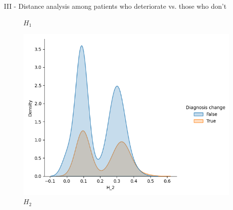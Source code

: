 \documentclass[aspectratio=169, 10pt, dvipsnames]{beamer}
\begin{document}
\begin{frame}[fragile]{III - Distance analysis among patients who deteriorate vs. those who don't}
\begin{figure}
    \caption{$H_1$}
  \end{figure}
  \endminipage
  \hfill
  \begin{figure}
    \centering
     \includegraphics[width=\textwidth]{figures/temporal_evolution/wasserstein_H_2_dist_diag_change.png}
     \caption{$H_2$}
  \end{figure}
  \endminipage
\end{frame}
\end{document}
